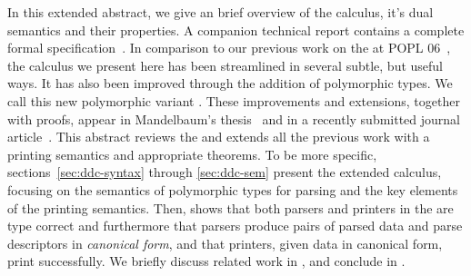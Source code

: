 


In this extended abstract, we give an brief overview of the calculus,
it's dual semantics and their properties.  A companion technical
report contains a complete formal
specification~\cite{fisher+:popl-sub-long}.  In comparison to our
previous work on the \ddcold{} at POPL 06~\cite{mandelbaum+:padsml},
the calculus we present here has been streamlined in several subtle,
but useful ways.  It has also been improved through the addition of
polymorphic types.  We call this new polymorphic variant
\ddc{}.  These improvements and extensions, together with
proofs, appear in Mandelbaum's thesis~\cite{mandelbaum:thesis} and in
a recently submitted journal article~\cite{fisher+:ddcjournal}.
This abstract reviews the \ddc{} and extends all the previous 
work with a printing semantics and appropriate theorems.
To be more specific,
sections~\ref{sec:ddc-syntax} through \ref{sec:ddc-sem} present the
extended \ddc{} calculus, focusing on the semantics of polymorphic
types for parsing and the key elements of the printing semantics.
Then,  shows that both parsers and
printers in the \ddc{} are type correct and furthermore that parsers
produce pairs of parsed data and parse descriptors in {\em canonical
  form}, and that printers, given data in canonical form, print
successfully. We briefly discuss related work in , and
conclude in .

